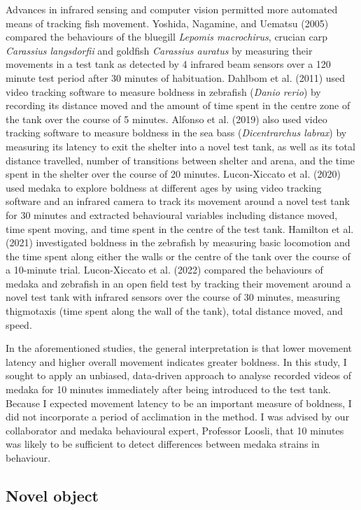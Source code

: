 \documentclass[
]{book}
\begin{document}
Advances in infrared sensing and computer vision permitted more automated means of tracking fish movement. Yoshida, Nagamine, and Uematsu (2005) compared the behaviours of the bluegill \emph{Lepomis macrochirus}, crucian carp \emph{Carassius langsdorfii} and goldfish \emph{Carassius auratus} by measuring their movements in a test tank as detected by 4 infrared beam sensors over a 120 minute test period after 30 minutes of habituation. Dahlbom et al. (2011) used video tracking software to measure boldness in zebrafish (\emph{Danio rerio}) by recording its distance moved and the amount of time spent in the centre zone of the tank over the course of 5 minutes. Alfonso et al. (2019) also used video tracking software to measure boldness in the sea bass (\emph{Dicentrarchus labrax}) by measuring its latency to exit the shelter into a novel test tank, as well as its total distance travelled, number of transitions between shelter and arena, and the time spent in the shelter over the course of 20 minutes. Lucon-Xiccato et al. (2020) used medaka to explore boldness at different ages by using video tracking software and an infrared camera to track its movement around a novel test tank for 30 minutes and extracted behavioural variables including distance moved, time spent moving, and time spent in the centre of the test tank. Hamilton et al. (2021) investigated boldness in the zebrafish by measuring basic locomotion and the time spent along either the walls or the centre of the tank over the course of a 10-minute trial. Lucon-Xiccato et al. (2022) compared the behaviours of medaka and zebrafish in an open field test by tracking their movement around a novel test tank with infrared sensors over the course of 30 minutes, measuring thigmotaxis (time spent along the wall of the tank), total distance moved, and speed.

In the aforementioned studies, the general interpretation is that lower movement latency and higher overall movement indicates greater boldness. In this study, I sought to apply an unbiased, data-driven approach to analyse recorded videos of medaka for 10 minutes immediately after being introduced to the test tank. Because I expected movement latency to be an important measure of boldness, I did not incorporate a period of acclimation in the method. I was advised by our collaborator and medaka behavioural expert, Professor Loosli, that 10 minutes was likely to be sufficient to detect differences between medaka strains in behaviour.

\hypertarget{novel-object}{%
\subsection{Novel object}\label{novel-object}}
\end{document}

